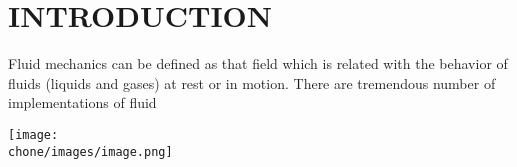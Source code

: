 \chapter{INTRODUCTION}
\indent\indent\indent
Fluid mechanics can be defined as that field which is related
with the behavior of fluids (liquids and gases) at rest or in motion. There are tremendous number of implementations of fluid

\texttt{[image: \\chone/images/image.png]}